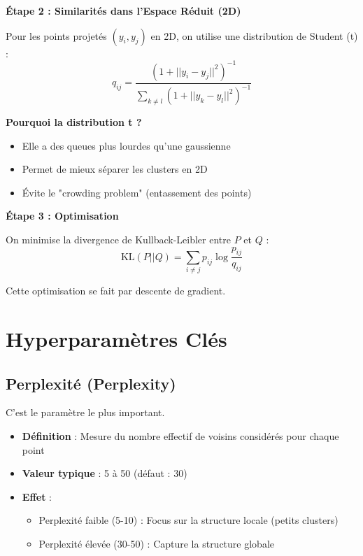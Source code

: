 \documentclass[a4paper,11pt]{article}
\begin{document}
\begin{mathbox}
\textbf{Étape 2 : Similarités dans l'Espace Réduit (2D)}

Pour les points projetés $(y_i, y_j)$ en 2D, on utilise une distribution de Student (t) :
$$ q_{ij} = \frac{(1 + ||y_i - y_j||^2)^{-1}}{\sum_{k \neq l} (1 + ||y_k - y_l||^2)^{-1}} $$

\textbf{Pourquoi la distribution t ?}
\begin{itemize}
    \item Elle a des queues plus lourdes qu'une gaussienne
    \item Permet de mieux séparer les clusters en 2D
    \item Évite le "crowding problem" (entassement des points)
\end{itemize}
\end{mathbox}

\begin{mathbox}
\textbf{Étape 3 : Optimisation}

On minimise la divergence de Kullback-Leibler entre $P$ et $Q$ :
$$ \text{KL}(P||Q) = \sum_{i \neq j} p_{ij} \log \frac{p_{ij}}{q_{ij}} $$

Cette optimisation se fait par descente de gradient.
\end{mathbox}

\section{Hyperparamètres Clés}

\subsection{Perplexité (Perplexity)}

C'est le paramètre le plus important.

\begin{itemize}
    \item \textbf{Définition} : Mesure du nombre effectif de voisins considérés pour chaque point
    \item \textbf{Valeur typique} : 5 à 50 (défaut : 30)
    \item \textbf{Effet} :
    \begin{itemize}
        \item Perplexité faible (5-10) : Focus sur la structure locale (petits clusters)
        \item Perplexité élevée (30-50) : Capture la structure globale
    \end{itemize}
\end{itemize}
\end{document}

